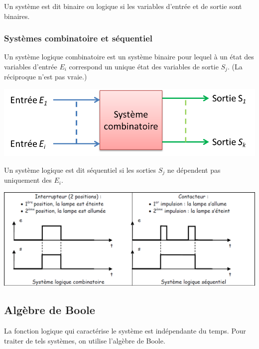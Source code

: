 \documentclass[11pt,oneside]{article}
\begin{document}
\begin{defi}
Un système est dit binaire ou logique si les variables d'entrée et de sortie sont binaires. 
\end{defi}

\subsubsection{Systèmes combinatoire et séquentiel}
\begin{defi}
Un système logique combinatoire est un système binaire pour lequel à un état des variables d'entrée $E_i$ correspond un unique état des variables de sortie $S_j$. (La réciproque n'est pas vraie.)
\end{defi}

\begin{center}
\includegraphics[width=.6\textwidth]{png/fig_08}
\end{center}

\begin{defi}
Un système logique est dit séquentiel si les sorties $S_j$ ne dépendent pas uniquement des $E_i$.
\end{defi}

\begin{exemple}
\begin{center}
\includegraphics[width=.9\textwidth]{png/fig_09}
\end{center}

\end{exemple}


\subsection{Algèbre de Boole}

La fonction logique qui caractérise le système est indépendante du temps. Pour traiter de tels systèmes, on utilise l'algèbre de Boole. 
\end{document}
